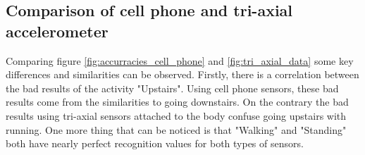 \documentclass[conference]{IEEEtran}
\begin{document}
\subsection{Comparison of cell phone and tri-axial accelerometer}

Comparing figure \ref{fig:accurracies_cell_phone} and \ref{fig:tri_axial_data} some key differences and similarities can be observed. Firstly, there is a correlation between the bad results of the activity "Upstairs". Using cell phone sensors, these bad results come from the similarities to going downstairs. On the contrary the bad results using tri-axial sensors attached to the body confuse going upstairs with running.
One more thing that can be noticed is that "Walking" and "Standing" both have nearly perfect recognition values for both types of sensors.
\\
\end{document}
